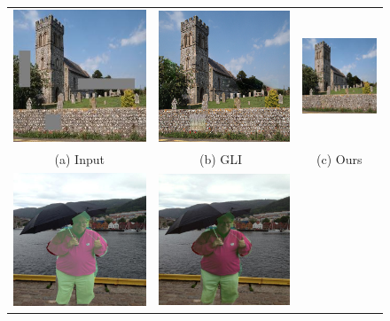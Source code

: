 \begin{figure}[t]
\centering
\setlength\tabcolsep{1pt}
\begin{tabular}{ccc}
  \includegraphics[width=.34\textwidth]{figures/teaser/000000120572_input_image.jpg}&
  \includegraphics[width=.34\textwidth]{figures/teaser/output_mask17.png}&
  \includegraphics[width=.34\textwidth]{figures/teaser/000000120572_synthesized_image.jpg} \\
  (a) Input  & (b) GLI~\cite{iizuka2017globally} & (c) Ours  \\
  \includegraphics[width=.34\textwidth]{figures/teaser/input.jpg}&
  \includegraphics[width=.34\textwidth]{figures/teaser/dh.jpg}&

\end{tabular}
\end{figure}
